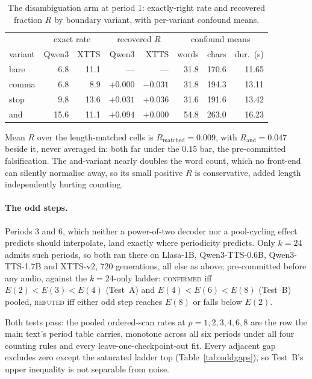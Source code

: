 \begin{table}[tp]\centering
\caption{The disambiguation arm at period 1: exactly-right rate and recovered fraction $R$ by boundary variant, with per-variant confound means.}
\label{tab:disambig}
\begin{tabular}{@{}lrrrrrrr@{}}
\toprule
 & \multicolumn{2}{c}{exact rate} & \multicolumn{2}{c}{recovered $R$} & \multicolumn{3}{c}{confound means} \\
variant & Qwen3 & XTTS & Qwen3 & XTTS & words & chars & dur.\ (s) \\
\midrule
bare  &  6.8 & 11.1 & ---      & ---      & 31.8 & 170.6 & 11.65 \\
comma &  6.8 &  8.9 & $+0.000$ & $-0.031$ & 31.8 & 194.3 & 13.11 \\
stop  &  9.8 & 13.6 & $+0.031$ & $+0.036$ & 31.6 & 191.6 & 13.42 \\
and   & 15.6 & 11.1 & $+0.094$ & $+0.000$ & 54.8 & 263.0 & 16.23 \\
\bottomrule
\end{tabular}
\end{table}

\noindent Mean $R$ over the length-matched cells is
$R_{\text{matched}}=0.009$, with $R_{\text{and}}=0.047$ beside it,
never averaged in: both far under the $0.15$ bar, the pre-committed
falsification. The and-variant nearly doubles the word count, which no
front-end can silently normalise away, so its small positive $R$ is
conservative, added length independently hurting counting.


\paragraph{The odd steps.} Periods $3$ and $6$, which neither a
power-of-two decoder nor a pool-cycling effect predicts should
interpolate, land exactly where periodicity predicts. Only $k{=}24$
admits such periods, so both ran there on Llasa-1B, Qwen3-TTS-0.6B,
Qwen3-TTS-1.7B and XTTS-v2, $720$ generations, all else as above;
pre-committed before any audio, against the $k{=}24$-only ladder:
\textsc{confirmed} iff $E(2)<E(3)<E(4)$ (Test~A) and $E(4)<E(6)<E(8)$
(Test~B) pooled, \textsc{refuted} iff either odd step reaches $E(8)$
or falls below $E(2)$.

Both tests pass: the pooled ordered-scan rates at $p=1,2,3,4,6,8$ are
the row the main text's period table carries, monotone across all six
periods under all four counting rules and every
leave-one-checkpoint-out fit. Every adjacent gap excludes zero except
the saturated ladder top (Table~\ref{tab:oddgaps}), so Test~B's upper
inequality is not separable from noise.

